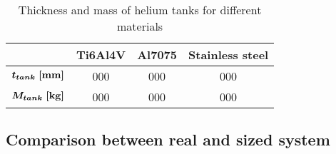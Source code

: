 \begin{table}[H]
    \renewcommand{\arraystretch}{1.3}
    \centering
    \begin{tabular}{|c|c|c|c|}
        \hline
        & \textbf{Ti6Al4V} & \textbf{Al7075} & \textbf{Stainless steel} \\
        \hline
        $\boldsymbol{t_{tank} \; [\textrm{\textbf{mm}}]}$ &
        000 & 000 & 000 \\
        \hline
        $\boldsymbol{M_{tank} \; [\textrm{\textbf{kg}}]}$ &
        \cellcolor{bluePoli!25}000 & 000 & 000 \\
        \hline
    \end{tabular}
    \caption{Thickness and mass of helium tanks for different materials}
    \label{table:sizing_helium}
\end{table}

\subsection{Comparison between real and sized system}
\label{subsec:sizing_comparison}

